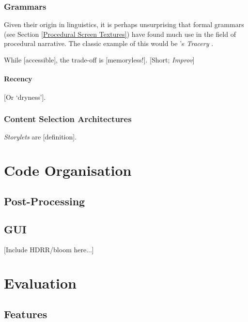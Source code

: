 \documentclass[a4paper, 11pt]{article}
\begin{document}
\begin{flushleft}
\subsubsection{Grammars}

Given their origin in linguistics, it is perhaps unsurprising that formal grammars (see Section \ref{Procedural Screen Textures}) have found much use in the field of procedural narrative. The classic example of this would be \citeauthor{comptonTracery}'s \textit{Tracery} \citeyearpar{comptonTracery}.

\vspace{5pt}\noindent
While [accessible], the trade-off is [memoryless!]. [Short; \textit{Improv}]

\paragraph{Recency} [Or `dryness'].

\subsubsection{Content Selection Architectures} \textit{Storylets} \citep{kreminskiStorylets} are [definition].

\vspace{5pt}
 
\section{Code Organisation}


\subsection{Post-Processing}

\subsection{GUI}

[Include HDRR/bloom here...]

\section{Evaluation}\label{Evaluation}

\subsection{Features}


\end{flushleft}
\end{document}
